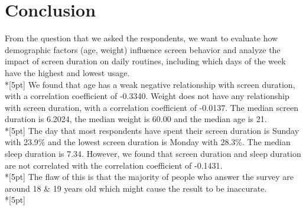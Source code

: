 \chapter*{Conclusion}
From the question that we asked the respondents, we want to evaluate how demographic factors (age, weight) influence screen behavior and analyze the impact of screen duration on daily routines, including which days of the week have the highest and lowest usage.\\*[5pt]
We found that age has a weak negative relationship with screen duration, with a correlation coefficient of -0.3340. Weight does not have any relationship with screen duration, with a correlation coefficient of -0.0137. The median screen duration is 6.2024, the median weight is 60.00 and the median age is 21.\\*[5pt]
The day that most respondents have spent their screen duration is Sunday with 23.9\% and the lowest screen duration is Monday with 28.3\%. The median sleep duration is 7.34. However, we found that screen duration and sleep duration are not correlated with the correlation coefficient of -0.1431.\\*[5pt]
The flaw of this is that the majority of people who answer the survey are around 18 & 19 years old which might cause the result to be inaccurate.\\*[5pt]